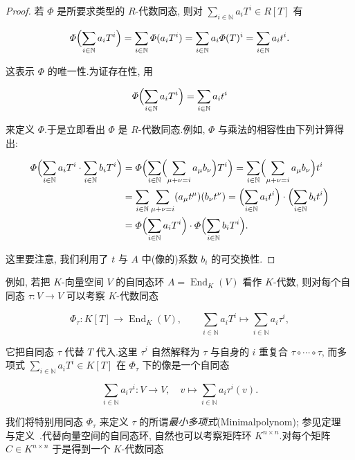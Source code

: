 \begin{proof}
若 $\varPhi$ 是所要求类型的 $R$-代数同态, 则对 $\sum_{i \in \mathbb{N}} a_i T^i \in R[T]$ 有

\[
\varPhi\Bigl(\sum_{i \in \mathbb{N}} a_i T^i\Bigr) = \sum_{i \in \mathbb{N}} \varPhi(a_i T^i) = \sum_{i \in \mathbb{N}} a_i \varPhi(T)^i = \sum_{i \in \mathbb{N}} a_i t^i\text{.}
\]

这表示 $\varPhi$ 的唯一性.为证存在性, 用

\[
\varPhi\Bigl(\sum_{i \in \mathbb{N}} a_i T^i\Bigr) = \sum_{i \in \mathbb{N}} a_i t^i
\]

来定义 $\varPhi$.于是立即看出 $\varPhi$ 是 $R$-代数同态.例如, $\varPhi$ 与乘法的相容性由下列计算得出:

\[
\begin{aligned}
\varPhi\Bigl(\sum_{i \in \mathbb{N}} a_i T^i \cdot \sum_{i \in \mathbb{N}} b_i T^i\Bigr)
&= \varPhi\Bigl(\sum_{i \in \mathbb{N}} \Bigl(\sum_{\mu + \nu = i} a_\mu b_\nu\Bigr) T^i\Bigr)
 = \sum_{i \in \mathbb{N}} \Bigl(\sum_{\mu + \nu = i} a_\mu b_\nu\Bigr) t^i \\
&= \sum_{i \in \mathbb{N}} \sum_{\mu + \nu = i} (a_\mu t^\mu)(b_\nu t^\nu)
 = \Bigl(\sum_{i \in \mathbb{N}} a_i t^i\Bigr) \cdot \Bigl(\sum_{i \in \mathbb{N}} b_i t^i\Bigr) \\
&= \varPhi\Bigl(\sum_{i \in \mathbb{N}} a_i T^i\Bigr) \cdot \varPhi\Bigl(\sum_{i \in \mathbb{N}} b_i T^i\Bigr)\text{.}
\end{aligned}
\]

这里要注意, 我们利用了 $t$ 与 $A$ 中(像的)系数 $b_i$ 的可交换性.
\end{proof}

例如, 若把 $K$-向量空间 $V$ 的自同态环 $A = \operatorname{End}_K(V)$ 看作 $K$-代数, 则对每个自同态 $\tau \colon V \longrightarrow V$ 可以考察 $K$-代数同态

\[
\varPhi_\tau \colon K[T] \longrightarrow \operatorname{End}_K(V), \qquad \sum_{i \in \mathbb{N}} a_i T^i \longmapsto \sum_{i \in \mathbb{N}} a_i \tau^i,
\]

它把自同态 $\tau$ 代替 $T$ 代入.这里 $\tau^i$ 自然解释为 $\tau$ 与自身的 $i$ 重复合 $\tau \circ \cdots \circ \tau$, 而多项式 $\sum_{i \in \mathbb{N}} a_i T^i \in K[T]$ 在 $\varPhi_\tau$ 下的像是一个自同态

\[
\sum_{i \in \mathbb{N}} a_i \tau^i \colon V \longrightarrow V, \quad v \longmapsto \sum_{i \in \mathbb{N}} a_i \tau^i(v)\text{.}
\]

我们将特别用同态 $\varPhi_\tau$ 来定义 $\tau$ 的所谓\emph{最小多项式}(\textup{Minimalpolynom}); 参见定理~ 与定义~.代替向量空间的自同态环, 自然也可以考察矩阵环 $K^{n \times n}$.对每个矩阵 $C \in K^{n \times n}$ 于是得到一个 $K$-代数同态

